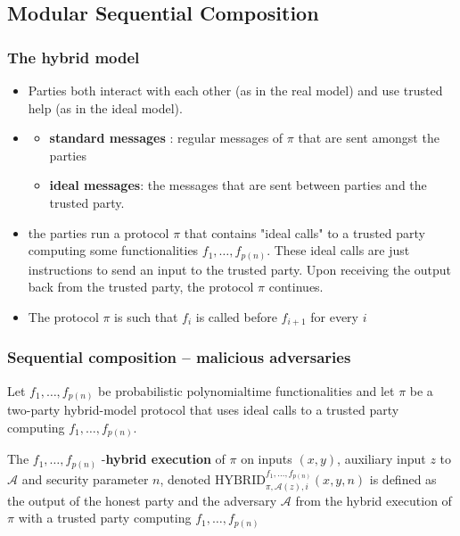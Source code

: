 \documentclass{beamer}
\begin{document}
    \subsection{Modular Sequential Composition}
    \subsectionpage

    \begin{frame}
        \frametitle{The hybrid model}
        \begin{itemize}
            \item Parties both interact with each other (as in the real model) and use trusted help (as in the ideal model). 
            \item \begin{itemize}
                \item \textbf{standard messages} : regular messages of $\pi$ that are sent amongst the parties
                \item \textbf{ideal messages}:  the messages that are sent between parties and the trusted party.   
            \end{itemize}
            \item the parties run a protocol $\pi$ that contains "ideal calls" to a trusted party computing some functionalities $f_{1}, \ldots, f_{p(n)}$. These ideal calls are just instructions to send an input to the trusted party. Upon receiving the output back from the trusted party, the protocol $\pi$ continues. 
            \item The protocol $\pi$ is such that $f_{i}$ is called before $f_{i+1}$ for every $i$
        \end{itemize}
    
        
    
    \end{frame}

    \begin{frame}
        \frametitle{Sequential composition – malicious adversaries}
        Let $f_{1}, \ldots, f_{p(n)}$ be probabilistic polynomialtime functionalities and let $\pi$ be a two-party hybrid-model protocol that uses ideal calls to a trusted party computing $f_{1}, \ldots, f_{p(n)} .$ 

        The $f_{1}, \ldots, f_{p(n)}$ -\textbf{hybrid execution} of $\pi$ on inputs $(x, y)$, auxiliary input $z$ to $\mathcal{A}$ and security parameter $n$, denoted $\mathrm{HYBRID}_{\pi, \mathcal{A}(z), i}^{f_{1}, \ldots, f_{p(n)}}(x, y, n)$ is defined as the output of the honest party and the adversary $\mathcal{A}$ from the hybrid execution of $\pi$ with a trusted party computing $f_{1}, \ldots, f_{p(n)}$    
    
        
    
    \end{frame}
\end{document}
